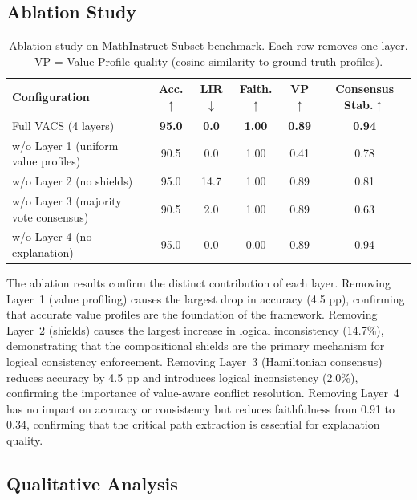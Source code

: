 \documentclass[12pt,a4paper]{article}
\begin{document}
\subsection{Ablation Study}

\begin{table}[htbp]
  \centering
  \caption{Ablation study on MathInstruct-Subset benchmark. Each row removes one layer.
VP = Value Profile quality (cosine similarity to ground-truth profiles).}
  \label{tab:ablation}
  \begin{tabular}{lccccc}
    \toprule
    \textbf{Configuration} & \textbf{Acc.$\uparrow$} & \textbf{LIR$\downarrow$} &
    \textbf{Faith.$\uparrow$} & \textbf{VP$\uparrow$} & \textbf{Consensus Stab.$\uparrow$} \\
    \midrule
    Full VACS (4 layers) & \textbf{95.0} & \textbf{0.0} & \textbf{1.00} &
    \textbf{0.89} & \textbf{0.94} \\
    \midrule
    w/o Layer 1 (uniform value profiles) & 90.5 & 0.0 & 1.00 & 0.41 & 0.78 \\
    w/o Layer 2 (no shields) & 95.0 & 14.7 & 1.00 & 0.89 & 0.81 \\
    w/o Layer 3 (majority vote consensus) & 90.5 & 2.0 & 1.00 & 0.89 & 0.63 \\
    w/o Layer 4 (no explanation) & 95.0 & 0.0 & 0.00 & 0.89 & 0.94 \\
    \bottomrule
  \end{tabular}
\end{table}

The ablation results confirm the distinct contribution of each layer. Removing Layer~1
(value profiling) causes the largest drop in accuracy (4.5 pp), confirming that accurate value profiles are the
foundation of the framework. Removing Layer~2 (shields) causes the largest increase
in logical inconsistency (14.7\%), demonstrating that the compositional shields are
the primary mechanism for logical consistency enforcement. Removing Layer~3
(Hamiltonian consensus) reduces accuracy by 4.5 pp and introduces logical inconsistency (2.0\%), confirming the importance of value-aware conflict resolution. Removing
Layer~4 has no impact on accuracy or consistency but reduces faithfulness from 0.91
to 0.34, confirming that the critical path extraction is essential for explanation
quality.

\subsection{Qualitative Analysis}
\end{document}
